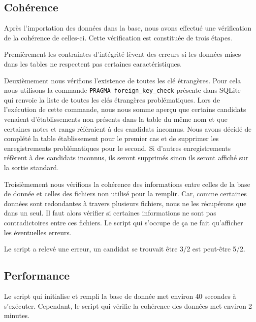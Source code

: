 \documentclass[12pt]{article}
\begin{document}
    \subsection{Cohérence} \label{parag:coherence}
        Après l'importation des données dans la base, nous avons effectué une vérification de la cohérence de celles-ci. Cette vérification est constituée de trois étapes.

        Premièrement les contraintes d'intégrité lèvent des erreurs si les données mises dans les tables ne respectent pas certaines caractéristiques.

        Deuxièmement nous vérifions l'existence de toutes les clé étrangères. Pour cela nous utilisons la commande \verb|PRAGMA foreign_key_check| présente dans \textsf{SQLite} qui renvoie la liste de toutes les clés étrangères problématiques. Lors de l'exécution de cette commande, nous nous somme aperçu que certains candidats venaient d'établissements non présents dans la table du même nom et que certaines notes et rangs référaient à des candidats inconnus. Nous avons décidé de complété la table établissement pour le premier cas et de supprimer les enregistrements problématiques pour le second. Si d'autres enregistrements réfèrent à des candidats inconnus, ils seront supprimés sinon ils seront affiché sur la sortie standard.
        
        Troisièmement nous vérifions la cohérence des informations entre celles de la base de donnée et celles des fichiers non utilisé pour la remplir. Car, comme certaines données sont redondantes à travers plusieurs fichiers, nous ne les récupérons que dans un seul. Il faut alors vérifier si certaines informations ne sont pas contradictoires entre ces fichiers. Le script qui s'occupe de ça ne fait qu'afficher les éventuelles erreurs. 
        
        Le script a relevé une erreur, un candidat se trouvait être 3/2 est peut-être 5/2.
        
    \subsection{Performance}
        Le script qui initialise et rempli la base de donnée met environ 40 secondes à s'exécuter. Cependant, le script qui vérifie la cohérence des données met environ 2 minutes.
\end{document}
